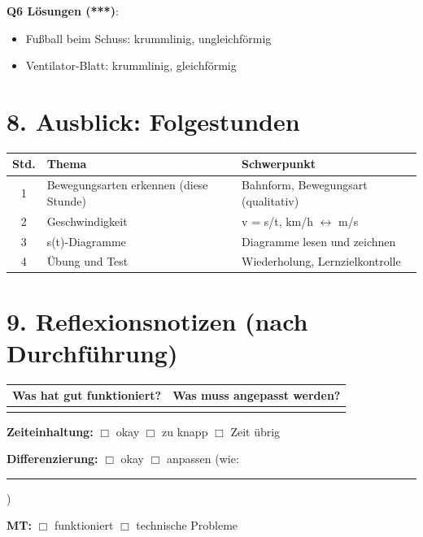 \documentclass[11pt, a4paper]{article}
\begin{document}
\textbf{Q6 Lösungen (***)}:
\begin{itemize}[itemsep=1pt]
    \item Fußball beim Schuss: krummlinig, ungleichförmig
    \item Ventilator-Blatt: krummlinig, gleichförmig
\end{itemize}


\section*{8. Ausblick: Folgestunden}

\begin{tabular}{|c|l|l|}
\hline
\textbf{Std.} & \textbf{Thema} & \textbf{Schwerpunkt} \\
\hline
1 & Bewegungsarten erkennen (diese Stunde) & Bahnform, Bewegungsart (qualitativ) \\
\hline
2 & Geschwindigkeit & v = s/t, km/h $\leftrightarrow$ m/s \\
\hline
3 & s(t)-Diagramme & Diagramme lesen und zeichnen \\
\hline
4 & Übung und Test & Wiederholung, Lernzielkontrolle \\
\hline
\end{tabular}


\section*{9. Reflexionsnotizen (nach Durchführung)}

\begin{tabular}{|p{7cm}|p{7cm}|}
\hline
\textbf{Was hat gut funktioniert?} & \textbf{Was muss angepasst werden?} \\
\hline
& \\[2.5cm]
\hline
\end{tabular}

\vspace{0.5em}

\textbf{Zeiteinhaltung:} $\Box$ okay \quad $\Box$ zu knapp \quad $\Box$ Zeit übrig

\textbf{Differenzierung:} $\Box$ okay \quad $\Box$ anpassen (wie: \rule{4cm}{0.4pt})

\textbf{MT:} $\Box$ funktioniert \quad $\Box$ technische Probleme
\end{document}
